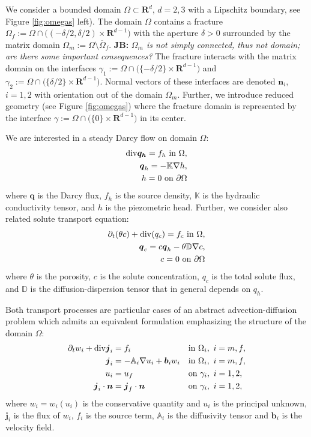 \documentclass[a4paper]{article}
\def\prtl{\partial}
\def\vc#1{\mathbf{\boldsymbol{#1}}}     %
\def\tn#1{{\mathbb{#1}}}    %
\def\div{{\rm div}}
\def\grad{\nabla}
\def\Real{{\mathbf R}}
\newcommand{\note}[2]{{\color{blue} \textbf{ #1:} \textit{#2}}}
\begin{document}
We consider a bounded domain $\Omega \subset \Real^d$, $d=2,3$ with a Lipschitz boundary, see Figure \ref{fig:omegas} left). The domain $\Omega$ contains 
a fracture $\Omega_f:=\Omega\cap \big((-\delta/2,\delta/2)\times\Real^{d-1}\big)$ 
with the aperture $\delta>0$ surrounded by the matrix domain $\Omega_m:=\Omega\setminus\overline\Omega_f$. 
\note{JB}{$\Omega_m$ is not simply connected, thus not domain; are there some important consequences?}
The fracture interacts with the matrix domain on the interfaces 
$\gamma_1:=\Omega\cap\big( \{-\delta/2\}\times \Real^{d-1}\big)$ and 
$\gamma_2:=\Omega\cap\big( \{ \delta/2\}\times \Real^{d-1}\big)$. Normal vectors of these interfaces are denoted $\vc n_i$, $i=1,2$ with orientation out of the domain $\Omega_m$.
Further, we introduce reduced geometry (see Figure \ref{fig:omegas})
where the fracture domain is represented by the interface $\gamma:=\Omega\cap\big(\{0\}\times\Real^{d-1}\big)$ in its center. 

We are interested in a steady Darcy flow on domain $\Omega$:
\begin{subequations}
\label{eq:darcy_flow}
\begin{align}
    \div \vc{q_h} = f_h \mbox{ in }\Omega, \\
    \vc q_h = -\tn K \grad h, \\
    h=0\mbox{ on }\partial\Omega
\end{align}
\end{subequations}
where $\vc q$ is the Darcy flux, $f_h$ is the source density, $\tn K$ is the hydraulic conductivity tensor, and $h$ is the piezometric head.
Further, we consider also related solute transport equation:
\begin{align}
    \label{eq:solute_transport}
    \prtl_t (\theta c) + \div(q_c) = f_c \mbox{ in }\Omega,\\
    \vc q_c = c \vc q_h - \theta \tn D \grad c, \\
    c=0\mbox{ on }\partial\Omega
\end{align}
where $\theta$ is the porosity, $c$ is the solute concentration, $q_c$ is the total solute flux, and $\tn D$ is the diffusion-dispersion tensor that in general depends on $q_h$.

Both transport processes are particular cases of an abstract advection-diffusion problem which admits an equivalent formulation
emphasizing the structure of the domain $\Omega$:
\begin{align}
  \label{eq:full:continuity}
  \prtl_t w_i + \div \vc j_i &= f_i&&  \text{in } \Omega_i,\ i=m,f,\\
  \label{eq:full:flux}
  \vc j_i &= - \tn A_i\grad u_i + \vc b_i w_i&& \text{in } \Omega_i,\ i=m,f,\\
  \label{eq:full:Dirichlet}
  u_i &= u_f&& \text{on } \gamma_i,\ i=1,2,\\
  \label{eq:full:Neumann}
  \vc j_i \cdot \vc n &= \vc j_f \cdot \vc n&& \text{on } \gamma_i,\ i=1,2,
\end{align}
where $w_i=w_i(u_i)$ is the conservative quantity and $u_i$ is the principal unknown, $\vc j_i$ is the flux of $w_i$, $f_i$ is the source term,
$\tn A_i$ is the diffusivity tensor and $\vc b_i$ is the velocity field. 
\end{document}
